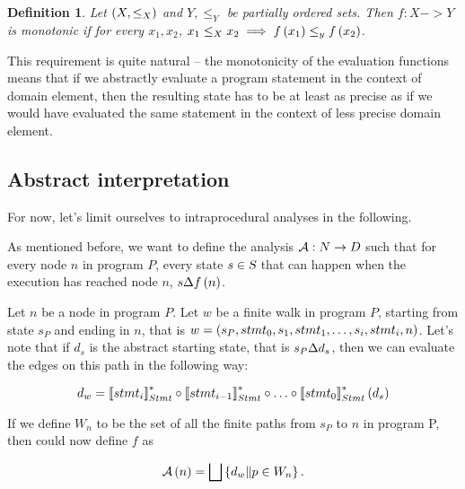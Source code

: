 \documentclass[..thesis.tex]{subfiles}
\newtheorem{defin}{Definition}[section]
\begin{document}
\begin{defin}
Let $\left( X, \leq_X \right)$ and $Y, \leq_Y$ be partially ordered sets. Then $f : X -> Y$ is \textit{monotonic} if for every $x_1, x_2$, $x_1 \leq_X x_2 \implies f \left( x_1 \right) \leq_y f \left( x_2 \right)$.   
\end{defin}

This requirement is quite natural -- the monotonicity of the evaluation functions means that if we abstractly evaluate a program statement in the context of domain element, then the resulting state has to be at least as precise as if we would have evaluated the same statement in the context of less precise domain element.  


\subsection{Abstract interpretation}

For now, let's limit ourselves to intraprocedural analyses in the following.
 
As mentioned before, we want to define the analysis $\mathcal{A} : N \to D$ such that for every node $n$ in program $P$, every state $s \in \textsl{S}$ that can happen when the execution has reached node $n$, $s \Delta f \left( n \right)$.
  
Let $n$ be a node in program $P$. Let $w$ be a finite walk in program $P$, starting from state $s_P$ and ending in $n$, that is $w = \left( s_P, stmt_0, s_1, stmt_1, \ldots, s_i, stmt_i, n \right)$. Let's note that if $d_s$ is the abstract starting state, that is $s_P \Delta d_s$, then we can evaluate the edges on this path in the following way:

\begin{equation*}
d_w = \left\llbracket stmt_i \right\rrbracket_{Stmt}^{*} \circ \left\llbracket stmt_{i-1} \right\rrbracket_{Stmt}^{*} \circ \ldots \circ  \left\llbracket stmt_0 \right\rrbracket_{Stmt}^{*} \left( d_s \right)  
\end{equation*}
  
If we define $W_n$ to be the set of all the finite paths from $s_P$ to $n$ in program P, then could now define $f$ as

\begin{equation*}
\mathcal{A} \left( n \right) = \bigsqcup \left\lbrace d_w \| p \in W_n \right\rbrace \text{.} 
\end{equation*}  

\end{document}
